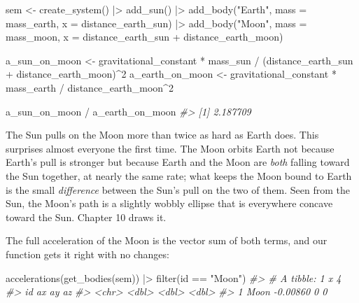 \documentclass[
  10.5pt,
  letterpaper,
]{scrbook}
\newenvironment{Shaded}{\begin{snugshade}}{\end{snugshade}}
\newcommand{\AttributeTok}[1]{\textcolor[rgb]{0.00,0.00,0.00}{#1}}
\newcommand{\CommentTok}[1]{\textcolor[rgb]{0.00,0.00,0.00}{\textit{#1}}}
\newcommand{\DecValTok}[1]{\textcolor[rgb]{0.00,0.00,0.00}{#1}}
\newcommand{\FunctionTok}[1]{\textcolor[rgb]{0.00,0.00,0.00}{#1}}
\newcommand{\NormalTok}[1]{\textcolor[rgb]{0.00,0.00,0.00}{#1}}
\newcommand{\OtherTok}[1]{\textcolor[rgb]{0.00,0.00,0.00}{#1}}
\newcommand{\SpecialCharTok}[1]{\textcolor[rgb]{0.00,0.00,0.00}{#1}}
\newcommand{\StringTok}[1]{\textcolor[rgb]{0.00,0.00,0.00}{#1}}
\theoremstyle{definition}
\theoremstyle{plain}
\theoremstyle{remark}
\begin{document}
\begin{Shaded}
\begin{Highlighting}[]
\NormalTok{sem }\OtherTok{\textless{}{-}} \FunctionTok{create\_system}\NormalTok{() }\SpecialCharTok{|\textgreater{}}
  \FunctionTok{add\_sun}\NormalTok{() }\SpecialCharTok{|\textgreater{}}
  \FunctionTok{add\_body}\NormalTok{(}\StringTok{"Earth"}\NormalTok{, }\AttributeTok{mass =}\NormalTok{ mass\_earth, }\AttributeTok{x =}\NormalTok{ distance\_earth\_sun) }\SpecialCharTok{|\textgreater{}}
  \FunctionTok{add\_body}\NormalTok{(}\StringTok{"Moon"}\NormalTok{,  }\AttributeTok{mass =}\NormalTok{ mass\_moon,}
           \AttributeTok{x =}\NormalTok{ distance\_earth\_sun }\SpecialCharTok{+}\NormalTok{ distance\_earth\_moon)}

\NormalTok{a\_sun\_on\_moon   }\OtherTok{\textless{}{-}}\NormalTok{ gravitational\_constant }\SpecialCharTok{*}\NormalTok{ mass\_sun }\SpecialCharTok{/}
\NormalTok{                   (distance\_earth\_sun }\SpecialCharTok{+}\NormalTok{ distance\_earth\_moon)}\SpecialCharTok{\^{}}\DecValTok{2}
\NormalTok{a\_earth\_on\_moon }\OtherTok{\textless{}{-}}\NormalTok{ gravitational\_constant }\SpecialCharTok{*}\NormalTok{ mass\_earth }\SpecialCharTok{/}
\NormalTok{                   distance\_earth\_moon}\SpecialCharTok{\^{}}\DecValTok{2}

\NormalTok{a\_sun\_on\_moon }\SpecialCharTok{/}\NormalTok{ a\_earth\_on\_moon}
\CommentTok{\#\textgreater{} [1] 2.187709}
\end{Highlighting}
\end{Shaded}

The Sun pulls on the Moon more than twice as hard as Earth does. This
surprises almost everyone the first time. The Moon orbits Earth not
because Earth's pull is stronger but because Earth and the Moon are
\emph{both} falling toward the Sun together, at nearly the same rate;
what keeps the Moon bound to Earth is the small \emph{difference}
between the Sun's pull on the two of them. Seen from the Sun, the Moon's
path is a slightly wobbly ellipse that is everywhere concave toward the
Sun. Chapter 10 draws it.

The full acceleration of the Moon is the vector sum of both terms, and
our function gets it right with no changes:

\begin{Shaded}
\begin{Highlighting}[]
\FunctionTok{accelerations}\NormalTok{(}\FunctionTok{get\_bodies}\NormalTok{(sem)) }\SpecialCharTok{|\textgreater{}}
  \FunctionTok{filter}\NormalTok{(id }\SpecialCharTok{==} \StringTok{"Moon"}\NormalTok{)}
\CommentTok{\#\textgreater{} \# A tibble: 1 x 4}
\CommentTok{\#\textgreater{}   id          ax    ay    az}
\CommentTok{\#\textgreater{}   \textless{}chr\textgreater{}    \textless{}dbl\textgreater{} \textless{}dbl\textgreater{} \textless{}dbl\textgreater{}}
\CommentTok{\#\textgreater{} 1 Moon  {-}0.00860     0     0}
\end{Highlighting}
\end{Shaded}
\end{document}
